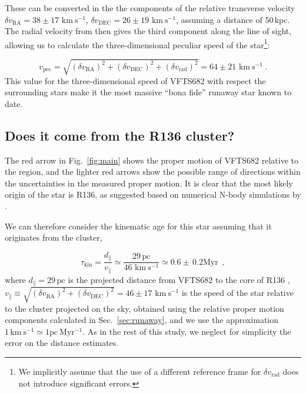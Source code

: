 \documentclass[apjl,twocolumn]{emulateapj}
\newcommand{\kms}{{\,\mathrm{km\ s^{-1}}}}
\DeclareRobustCommand{\Figref}[1]{Fig.~\ref{#1}}
\DeclareRobustCommand{\Secref}[1]{Sec.~\ref{#1}}
\begin{document}
These can be converted in the
the components of the relative transverse velocity $\delta v_\mathrm{RA}=38\pm17\,\kms$,
$\delta v_\mathrm{DEC}=26\pm19\,\kms$, assuming a distance of
50\,kpc. %
The radial velocity from
\cite{bestenlehner:11} then gives the third component along
the line of sight, allowing us to calculate the three-dimensional
peculiar speed of the star\footnote{We implicitly assume that the use
  of a different reference frame for $\delta v_\mathrm{rad}$ does not
  introduce significant errors.}:

\begin{equation}
  \label{eq:speed_around}
  v_\mathrm{pec} = \sqrt{\left(\delta v_\mathrm{RA}\right)^2
    +\left(\delta v_\mathrm{DEC}\right)^2+\left(\delta
      v_\mathrm{rad}\right)^2} = 64 \pm 21 
  \, \kms \ .
\end{equation}
This value for the three-dimensional speed of VFTS682 with respect the
surrounding stars make it the most massive ``bona fide'' runaway star
known to date.

\subsection{Does it come from the R136 cluster?}
\label{sec:r136_origin}

The red arrow in \Figref{fig:main} shows the proper motion of VFTS682
relative to the region, and the lighter red arrows show the possible
range of directions within the uncertainties in the measured proper
motion. It is clear that the most likely origin of the star is R136,
as suggested based on numerical N-body simulations by \cite{fujii:11, banerjee:12}.


We can therefore consider the kinematic age for this star assuming
that it originates from the cluster,

\begin{equation}
  \label{eq:kin_age}
  \tau_\mathrm{kin} = \frac{d_\parallel}{v_\parallel} \simeq
  \frac{29\,\mathrm{pc}}{46\,\kms} \simeq 0.6\pm\,0.2 \mathrm{Myr} \ \ ,
\end{equation}
where $d_\parallel =29$\,pc is the projected distance from VFTS682 to
the core of R136 \citep[][]{bestenlehner:11}, $v_\parallel \equiv \sqrt{\left(\delta v_\mathrm{RA}\right)^2
    +\left(\delta v_\mathrm{DEC}\right)^2} =46\pm
17\,\kms$ is the speed of the star relative to the cluster projected on the sky, obtained
using the relative proper motion components calculated in
\Secref{sec:runaway}, and we use the approximation $1 \kms \simeq 1
\mathrm{pc \ Myr^{-1}}$. As in the rest of this study, we neglect for
simplicity the error on the distance estimates.
\end{document}
